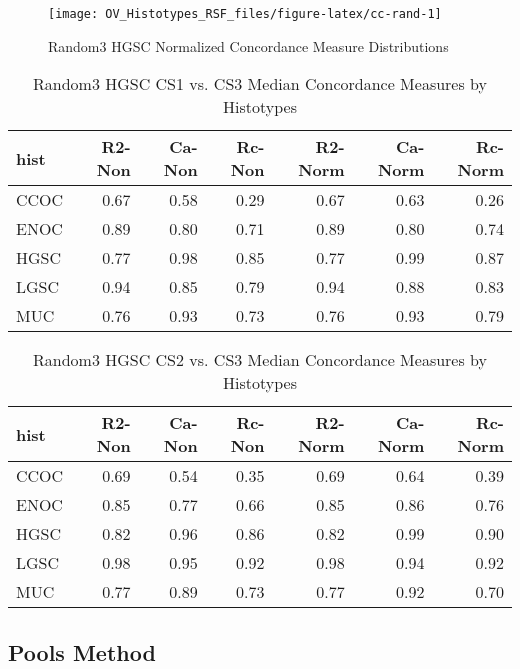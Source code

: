 \documentclass[
]{report}
\begin{document}
\begin{figure}[H]

{\centering \texttt{[image: OV\_Histotypes\_RSF\_files/figure-latex/cc-rand-1]} 

}

\caption{Random3 HGSC Normalized Concordance Measure Distributions}\label{fig:cc-rand}
\end{figure}

\begin{table}

\caption{\label{tab:rand3-hgsc-cs1-vs-cs3}Random3 HGSC CS1 vs. CS3 Median Concordance Measures by Histotypes}
\centering
\begin{tabular}[t]{l|r|r|r|r|r|r}
\hline
hist & R2-Non & Ca-Non & Rc-Non & R2-Norm & Ca-Norm & Rc-Norm\\
\hline
CCOC & 0.67 & 0.58 & 0.29 & 0.67 & 0.63 & 0.26\\
\hline
ENOC & 0.89 & 0.80 & 0.71 & 0.89 & 0.80 & 0.74\\
\hline
HGSC & 0.77 & 0.98 & 0.85 & 0.77 & 0.99 & 0.87\\
\hline
LGSC & 0.94 & 0.85 & 0.79 & 0.94 & 0.88 & 0.83\\
\hline
MUC & 0.76 & 0.93 & 0.73 & 0.76 & 0.93 & 0.79\\
\hline
\end{tabular}
\end{table}

\begin{table}

\caption{\label{tab:rand3-hgsc-cs2-vs-cs3}Random3 HGSC CS2 vs. CS3 Median Concordance Measures by Histotypes}
\centering
\begin{tabular}[t]{l|r|r|r|r|r|r}
\hline
hist & R2-Non & Ca-Non & Rc-Non & R2-Norm & Ca-Norm & Rc-Norm\\
\hline
CCOC & 0.69 & 0.54 & 0.35 & 0.69 & 0.64 & 0.39\\
\hline
ENOC & 0.85 & 0.77 & 0.66 & 0.85 & 0.86 & 0.76\\
\hline
HGSC & 0.82 & 0.96 & 0.86 & 0.82 & 0.99 & 0.90\\
\hline
LGSC & 0.98 & 0.95 & 0.92 & 0.98 & 0.94 & 0.92\\
\hline
MUC & 0.77 & 0.89 & 0.73 & 0.77 & 0.92 & 0.70\\
\hline
\end{tabular}
\end{table}

\hypertarget{pools-method-1}{%
\subsection{Pools Method}\label{pools-method-1}}
\end{document}
